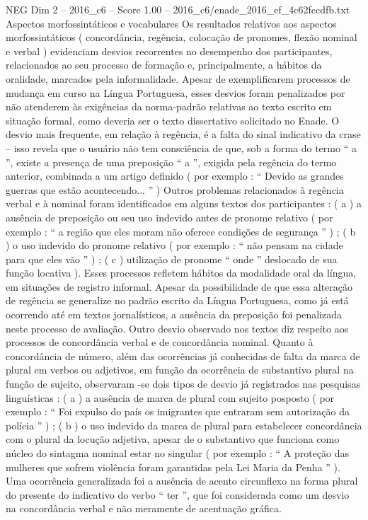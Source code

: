 \begin{textsample}{NEG Dim 2 – 2016\_c6 – Score 1.00 – 2016\_c6/enade\_2016\_ef\_4c62fccdfb.txt}
Aspectos morfossintáticos e vocabulares Os resultados relativos aos aspectos morfossintáticos ( concordância, regência, colocação de pronomes, flexão nominal e verbal ) evidenciam desvios recorrentes no desempenho dos participantes, relacionados ao seu processo de formação e, principalmente, a hábitos da oralidade, marcados pela informalidade.
Apesar de exemplificarem processos de mudança em curso na Língua Portuguesa, esses desvios foram penalizados por não atenderem às exigências da norma-padrão relativas ao texto escrito em situação formal, como deveria ser o texto dissertativo solicitado no Enade.
O desvio mais frequente, em relação à regência, é a falta do sinal indicativo da crase – isso revela que o usuário não tem consciência de que, sob a forma do termo “ a ”, existe a presença de uma preposição “ a ”, exigida pela regência do termo anterior, combinada a um artigo definido ( por exemplo : “ Devido as grandes guerras que estão acontecendo... ” ) Outros problemas relacionados à regência verbal e à nominal foram identificados em alguns textos dos participantes : ( a ) a ausência de preposição ou seu uso indevido antes de pronome relativo ( por exemplo : “ a região que eles moram não oferece condições de segurança ” ) ; ( b ) o uso indevido do pronome relativo ( por exemplo : “ não pensam na cidade para que eles vão ” ) ; ( c ) utilização de pronome “ onde ” deslocado de sua função locativa ).
Esses processos refletem hábitos da modalidade oral da língua, em situações de registro informal.
Apesar da possibilidade de que essa alteração de regência se generalize no padrão escrito da Língua Portuguesa, como já está ocorrendo até em textos jornalísticos, a ausência da preposição foi penalizada neste processo de avaliação.
Outro desvio observado nos textos diz respeito aos processos de concordância verbal e de concordância nominal.
Quanto à concordância de número, além das ocorrências já conhecidas de falta da marca de plural em verbos ou adjetivos, em função da ocorrência de substantivo plural na função de sujeito, observaram -se dois tipos de desvio já registrados nas pesquisas linguísticas : ( a ) a ausência de marca de plural com sujeito posposto ( por exemplo : “ Foi expulso do país os imigrantes que entraram sem autorização da polícia ” ) ; ( b ) o uso indevido da marca de plural para estabelecer concordância com o plural da locução adjetiva, apesar de o substantivo que funciona como núcleo do sintagma nominal estar no singular ( por exemplo : “ A proteção das mulheres que sofrem violência foram garantidas pela Lei Maria da Penha ” ).
Uma ocorrência generalizada foi a ausência de acento circunflexo na forma plural do presente do indicativo do verbo “ ter ”, que foi considerada como um desvio na concordância verbal e não meramente de acentuação gráfica.

\end{textsample}
